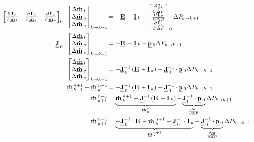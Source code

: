 \begin{align}
\begin{bmatrix}
\DerivParOne{\vec{I}_{e}}{\vec{\dot{m}}_{l}} & \DerivParOne{\vec{I}_{e}}{\vec{\dot{m}}_{g}}  & \DerivParOne{\vec{I}_{e}}{\vec{\dot{m}}_{e}}
\end{bmatrix}_{0}
\cdot
\begin{bmatrix}
\Delta \vec{\dot{m}}_l \\
\Delta \vec{\dot{m}}_g \\
\Delta \vec{\dot{m}}_e
\end{bmatrix}_{k\rightarrow k+1} & =
-\vec{E} -
\vec{I}_{k} -
\begin{bmatrix}
\DerivParOne{\vec{I}_{l}}{\Delta P} \\
\DerivParOne{\vec{I}_{g}}{\Delta P} \\
\DerivParOne{\vec{I}_{e}}{\Delta P}
\end{bmatrix}_{0}
\Delta P_{k \rightarrow k+1} \\
\mat{J}_{\,0}
\cdot
\begin{bmatrix}
\Delta \vec{\dot{m}}_l \\
\Delta \vec{\dot{m}}_g \\
\Delta \vec{\dot{m}}_e
\end{bmatrix}_{k\rightarrow k+1} & =
-\vec{E} -
\vec{I}_{k} -
\vec{p}_{0}
\Delta P_{k \rightarrow k+1} \\
\begin{bmatrix}
\Delta \vec{\dot{m}}_l \\
\Delta \vec{\dot{m}}_g \\
\Delta \vec{\dot{m}}_e
\end{bmatrix}_{k\rightarrow k+1} & =
-\mat{J}_{\,0}^{-1}\left(\vec{E} + \vec{I}_{k}\right) -
\mat{J}_{\,0}^{-1} \cdot \vec{p}_{0} \Delta P_{k \rightarrow k+1} \\
\vec{\dot{m}}^{n+1}_{k+1}- \vec{\dot{m}}^{n+1}_{k} & =
-\mat{J}_{\,0}^{-1}\left(\vec{E} + \vec{I}_{k}\right) -
\mat{J}_{\,0}^{-1} \cdot \vec{p}_{0} \Delta P_{k \rightarrow k+1}\\
\vec{\dot{m}}^{n+1}_{k+1} & =
\underbrace{\vec{\dot{m}}^{n+1}_{k} -\mat{J}_{\,0}^{-1}\left(\vec{E} + \vec{I}_{k}\right)}_{\vec{\dot{m}}^{*}_{k}} - \underbrace{\mat{J}_{\,0}^{-1} \cdot \vec{p}_{0}}_{\frac{\partial \vec{\dot{m}}}{\partial \Delta P}} \Delta P_{k \rightarrow k+1} \\
\vec{\dot{m}}^{n+1}_{k+1} & =
\underbrace{-\mat{J}_{\,0}^{-1}\cdot \vec{E} + \vec{\dot{m}}^{n+1}_{k} - \mat{J}^{-1}_{\,0}\cdot \vec{I}_{k}}_{\vec{\dot{m}}^{n+1}_{*}} - \underbrace{\mat{J}_{\,0}^{-1} \cdot \vec{p}_{0}}_{\frac{\partial \vec{\dot{m}}}{\partial \Delta P}} \Delta P_{k \rightarrow k+1}
\end{align}

